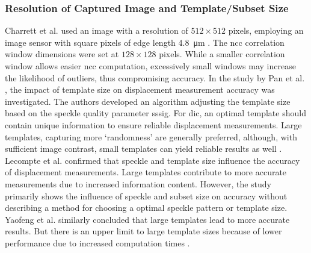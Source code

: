     \subsubsection{Resolution of Captured Image and Template/Subset Size}\label{subsubsection:template_size}
    Charrett et al. used an image with a resolution of \(512 \times 512\) pixels, employing an image sensor with square pixels of edge length \SI{4.8}{\micro\meter} \cite{charrett_2018}. The \gls{ncc} correlation window dimensions were set at \(128 \times 128\) pixels. While a smaller correlation window allows easier \gls{ncc} computation, excessively small windows may increase the likelihood of outliers, thus compromising accuracy. In the study by Pan et al. \cite{pan_subset}, the impact of template size on displacement measurement accuracy was investigated. The authors developed an algorithm adjusting the template size based on the speckle quality parameter \gls{sssig}. For \gls{dic}, an optimal template should contain unique information to ensure reliable displacement measurements. Large templates, capturing more `randomness' are generally preferred, although, with sufficient image contrast, small templates can yield reliable results as well \cite{pan_subset}. Lecompte et al. \cite{lecompte} confirmed that speckle and template size influence the accuracy of displacement measurements. Large templates contribute to more accurate measurements due to increased information content. However, the study primarily shows the influence of speckle and subset size on accuracy without describing a method for choosing a optimal speckle pattern or template size. Yaofeng et al. similarly concluded that large templates lead to more accurate results. But there is an upper limit to large template sizes because of lower performance due to increased computation times \cite{yaofeng}.

